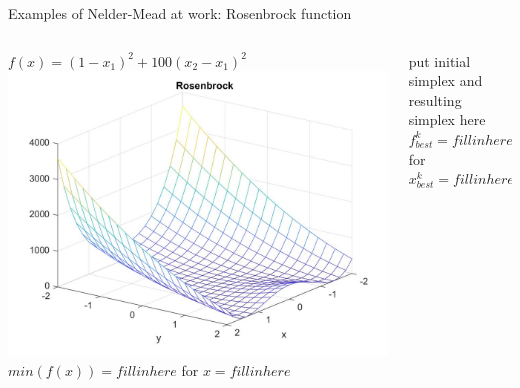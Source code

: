 \documentclass{beamer}
\begin{document}
\begin{frame}{Examples of Nelder-Mead at work: Rosenbrock function}
\begin{columns}
\begin{column}{0.49\linewidth}
	$f(x) =(1-x_1)^2 + 100(x_2-x_1)^2$ \\
	\includegraphics[width=0.95\linewidth]{rosenbrockPlotS1} \\
	$min(f(x))= fill in here $ for $x= fill in here$
\end{column}
\begin{column}{0.49\linewidth}
	put initial simplex and resulting simplex here\\
	$f^k_{best}= fill in here $ for $x^k_{best}= fill in here$
\end{column}
\end{columns}
\end{frame}
\end{document}

